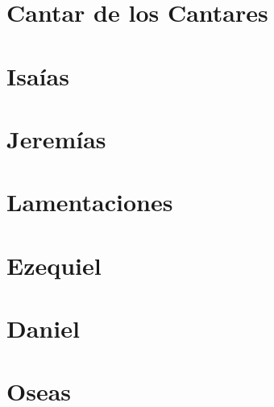 \chapter{Cantar de los Cantares}
\begin{multicols}{2}
  \raggedcolumns
  \parskip=0pt \relax
  
\end{multicols}

\chapter{Isaías}
\begin{multicols}{2}
  \raggedcolumns
  \parskip=0pt \relax
  
\end{multicols}

\chapter{Jeremías}
\begin{multicols}{2}
  \raggedcolumns
  \parskip=0pt \relax
  
\end{multicols}

\chapter{Lamentaciones}
\begin{multicols}{2}
  \raggedcolumns
  \parskip=0pt \relax
  
\end{multicols}

\chapter{Ezequiel}
\begin{multicols}{2}
  \raggedcolumns
  \parskip=0pt \relax
  
\end{multicols}

\chapter{Daniel}
\begin{multicols}{2}
  \raggedcolumns
  \parskip=0pt \relax
  
\end{multicols}

\chapter{Oseas}
\begin{multicols}{2}
  \raggedcolumns
  \parskip=0pt \relax
  
\end{multicols}

